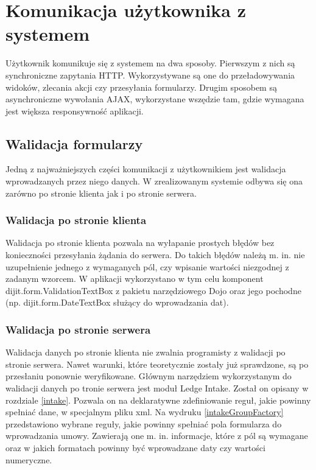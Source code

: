 \section[Komunikacja użytkownika z systemem][Komunikacja użytkownika z systemem]{Komunikacja użytkownika z systemem}
Użytkownik komunikuje się z systemem na dwa sposoby. Pierwszym z nich są synchroniczne zapytania HTTP. Wykorzystywane są one do przeładowywania widoków, zlecania akcji czy przesyłania formularzy. Drugim sposobem są asynchroniczne wywołania AJAX, wykorzystane wszędzie tam, gdzie wymagana jest większa responsywność aplikacji.

\subsection[Walidacja formularzy][Walidacja formularzy]{Walidacja formularzy}
Jedną z najważniejszych części komunikacji z użytkownikiem jest walidacja wprowadzanych przez niego danych. W zrealizowanym systemie odbywa się ona zarówno po stronie klienta jak i po stronie serwera.

\subsubsection{Walidacja po stronie klienta}
Walidacja po stronie klienta pozwala na wyłapanie prostych błędów bez konieczności przesyłania żądania do serwera. Do takich błędów należą m. in. nie uzupełnienie jednego z wymaganych pól, czy wpisanie wartości niezgodnej z zadanym wzorcem. W aplikacji wykorzystano w tym celu komponent dijit.form.ValidationTextBox z pakietu narzędziowego Dojo oraz jego pochodne (np. dijit.form.DateTextBox służący do wprowadzania dat).

\subsubsection{Walidacja po stronie serwera}
Walidacja danych po stronie klienta nie zwalnia programisty z walidacji po stronie serwera. Nawet warunki, które teoretycznie zostały już sprawdzone, są po przesłaniu ponownie weryfikowane. Głównym narzędziem wykorzystanym do walidacji danych po tronie serwera jest moduł Ledge Intake. Został on opisany w rozdziale \ref{intake}. Pozwala on na deklaratywne zdefiniowanie reguł, jakie powinny spełniać dane, w specjalnym pliku xml. Na wydruku \ref{intakeGroupFactory} przedstawiono wybrane reguły, jakie powinny spełniać pola formularza do wprowadzania umowy. Zawierają one m. in. informacje, które z pól są wymagane oraz w jakich formatach powinny być wprowadzane daty czy wartości numeryczne.

